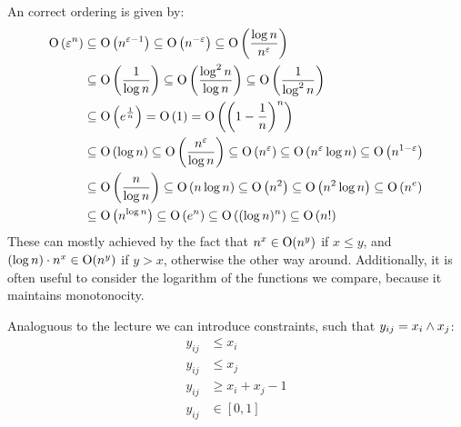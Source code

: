 \begin{aufgabe}
	An correct ordering is given by:
	\begin{align}
		\mathrm{O}\left(\varepsilon^n\right) & \subseteq \mathrm{O}\left(n^{\varepsilon-1}\right) \subseteq \mathrm{O}\left(n^{-\varepsilon}\right) \subseteq \mathrm{O}\left(\frac{\log n}{n^\varepsilon}\right)                                                                              \\
		                         & \subseteq \mathrm{O}\left(\frac{1}{\log n}\right) \subseteq \mathrm{O}\left(\frac{\log^2 n}{\log n}\right) \subseteq \mathrm{O}\left(\frac{1}{\log^2 n} \right)                                                            \\
		                         & \subseteq \mathrm{O}\left(e^\frac{1}{n}\right) = \mathrm{O}\left(1 \right) = \mathrm{O}\left(\left(1-\frac{1}{n}\right)^n\right)                                                                  \label{eq:equality_ex21} \\
		                         & \subseteq \mathrm{O}\left(\log n\right) \subseteq \mathrm{O}\left(\frac{n^\varepsilon}{\log n} \right)\subseteq  \mathrm{O}\left(n^\varepsilon\right) \subseteq \mathrm{O}\left(n^\varepsilon \log n\right) \subseteq \mathrm{O}\left(n^{1- \varepsilon} \right) \\
		                         & \subseteq \mathrm{O}\left(\frac{n}{\log n}\right) \subseteq \mathrm{O}\left(n \log n\right) \subseteq \mathrm{O}\left(n^2\right) \subseteq \mathrm{O}\left(n^2 \log n\right) \subseteq \mathrm{O}\left(n^e \right)                   \\
		                         & \subseteq \mathrm{O}\left(n^{\log n}\right) \subseteq \mathrm{O}\left(e^n\right) \subseteq \mathrm{O}\left((\log n)^n\right) \subseteq \mathrm{O}\left(n! \right)
	\end{align}
	These can mostly achieved by the fact that $n^x \in \mathrm{O}(n^y)$ if $x \leq y$, and
	$(\log n) \cdot n^x \in \mathrm{O}(n^y)$ if $y > x$, otherwise the other way around. Additionally, it is often useful to consider
	the logarithm of the functions we compare, because it maintains monotonocity.
\end{aufgabe}
\begin{aufgabe}
	Analoguous to the lecture we can introduce constraints, such that $y_{ij} = x_i \wedge x_j$:
	\begin{align*}
		y_{ij} & \leq x_i           \\
		y_{ij} & \leq x_j           \\
		y_{ij} & \geq x_i + x_j - 1 \\
		y_{ij} & \in [0,1]
	\end{align*}
\end{aufgabe}
